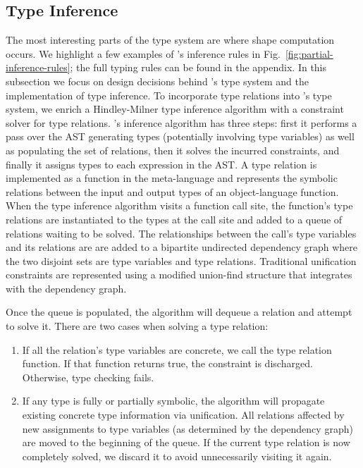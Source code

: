  \subsection{Type Inference}
  \label{sec:inference}

  The most interesting parts of the type system
    are where shape computation occurs.
  We highlight a few examples of \relay's inference
    rules in Fig.~\ref{fig:partial-inference-rules};
    the full typing rules can be found in the appendix.
  In this subsection we focus on design decisions behind \relay's type system
    and the implementation of type inference.
  To incorporate type relations into \relay's type system, we enrich
    a Hindley-Milner type inference algorithm with
    a constraint solver for type relations.
  \relay's inference algorithm has three steps: first it
    performs a pass over the AST generating types (potentially involving type variables)
    as well as populating the set of relations,
    then it solves the incurred constraints,
    and finally it assigns types to each expression in the AST.
  A type relation is implemented as a function in the
    meta-language and represents the symbolic relations between
    the input and output types of an object-language function.
  When the type inference algorithm visits a function call site, the function's type relations are
    instantiated to the types at the call site and added to a queue of relations waiting to be
    solved.
  The relationships between the call's type variables and its relations are are added to a
    bipartite undirected dependency graph where the two disjoint sets are type variables and type relations.
  Traditional unification constraints are represented using a modified union-find structure that
    integrates with the dependency graph.

  Once the queue is populated, the algorithm will dequeue a relation and attempt to solve it.
  There are two cases when solving a type relation:
  \begin{enumerate}
    \item If all the relation's type variables
    are concrete, we call the type relation function. If that function returns true, the
    constraint is discharged. Otherwise, type checking fails.
    \item If any type is fully or partially symbolic, the
      algorithm will propagate
      existing concrete type information via unification.
    All relations affected by new assignments to type
      variables (as determined by the dependency graph)
      are moved to the beginning of the queue.
    If the current type relation is now completely solved, we
    discard it to avoid unnecessarily visiting it again.
  \end{enumerate}

